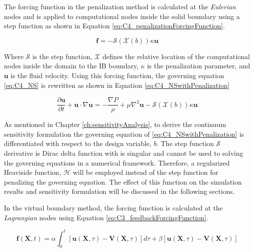 The forcing function in the penalization method is calculated at the \emph{Eulerian} nodes and is applied to computational nodes inside the solid boundary using a step function as shown in Equation \eqref{eq:C4_penalizationForcingFunction}.

\begin{equation}\label{eq:C4_penalizationForcingFunction}
    \mathbf{f} = -\mathcal{S}(\mathcal{X}(b)) \kappa \mathbf{u}
\end{equation}

Where $\mathcal{S}$ is the step function, $\mathcal{X}$ defines the relative location of the computational nodes inside the domain to the IB boundary, $\kappa$ is the penalization parameter, and $\mathbf{u}$ is the fluid velocity. Using this forcing function, the governing equation \eqref{eq:C4_NS} is rewritten as shown in Equation \eqref{eq:C4_NSwithPenalization}

\begin{equation}\label{eq:C4_NSwithPenalization}
    \frac{\partial \mathbf{u}}{\partial t} + \mathbf{u} \cdot \nabla \mathbf{u} = 
    -\frac{\nabla P}{\rho} + \mu \nabla^2 \mathbf{u} -\mathcal{S}(\mathcal{X}(b)) \kappa \mathbf{u}
\end{equation}

As mentioned in Chapter \ref{ch:sensitivityAnalysis}, to derive the continuum sensitivity formulation the governing equation of \eqref{eq:C4_NSwithPenalization} is differentiated with respect to the design variable, $b$. The step function $\mathcal{S}$ derivative is Dirac delta function with is singular and cannot be used to solving the governing equations in a numerical framework. Therefore, a regularized Heaviside function, $\mathcal{H}$ will be employed instead of the step function for penalizing the governing equation. The effect of this function on the simulation results and sensitivity formulation will be discussed in the following sections.

In the virtual boundary method, the forcing function is calculated at the \emph{Lagrangian} nodes using Equation \eqref{eq:C3_feedbackForcingFunction}.

\begin{equation}\label{eq:C3_feedbackForcingFunction}
    \mathbf{f}(\mathbf{X}, t) = 
    \alpha \int_0^t \left[ \mathbf{u}(\mathbf{X}, \tau) - \mathbf{V}(\mathbf{X}, \tau) \right] d\tau + 
    \beta \left[ \mathbf{u}(\mathbf{X}, \tau) - \mathbf{V}(\mathbf{X}, \tau) \right]
\end{equation}

